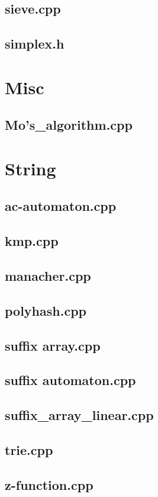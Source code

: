 \subsection{sieve.cpp}

\subsection{simplex.h}

\section{Misc}
\subsection{Mo's\_algorithm.cpp}

\section{String}
\subsection{ac-automaton.cpp}

\subsection{kmp.cpp}

\subsection{manacher.cpp}

\subsection{polyhash.cpp}

\subsection{suffix array.cpp}

\subsection{suffix automaton.cpp}

\subsection{suffix\_array\_linear.cpp}

\subsection{trie.cpp}

\subsection{z-function.cpp}

